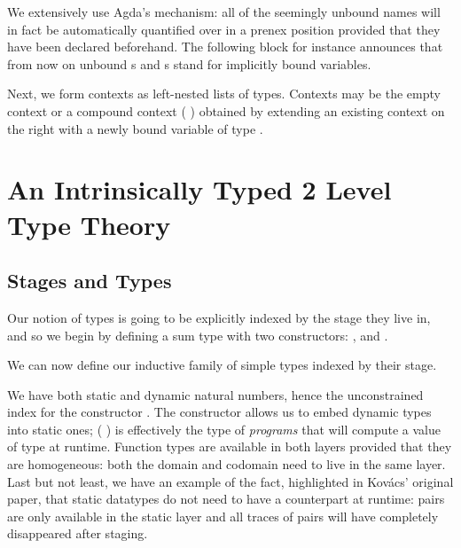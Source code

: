 \documentclass{article}
\begin{document}
We extensively use Agda's  mechanism: all of
the seemingly unbound names will in fact be automatically
quantified over in a prenex position provided that they
have been declared beforehand.
%
The following block for instance announces that from now
on unbound s and s stand for implicitly bound
 variables.


Next, we form contexts as left-nested lists of types.
Contexts may be the empty context 
or a compound context ( \AIC{,} ) obtained
by extending an existing context  on the right
with a newly bound variable of type .





\begin{mathpar}


\end{mathpar}



\section{An Intrinsically Typed 2 Level Type Theory}



\subsection{Stages and Types}

Our notion of types is going to be explicitly indexed by the
stage they live in, and so we begin by defining a sum
type  with two constructors: ,
and .


We can now define our inductive family of simple types indexed
by their stage.


We have both static and dynamic natural numbers,
hence the unconstrained index  for the
constructor .
%
The constructor  allows us to embed dynamic
types into static ones; ( ) is effectively
the type of \emph{programs} that will compute a value of
type  at runtime.
%
Function types are available in both layers provided that
they are homogeneous: both the domain and codomain need
to live in the same layer.
%
Last but not least, we have an example of the fact,
highlighted in Kov{\'{a}}cs' original paper, that static
datatypes do not need to have a counterpart at runtime:
pairs are only available in the static layer and all traces
of pairs will have completely disappeared after staging.
\end{document}
